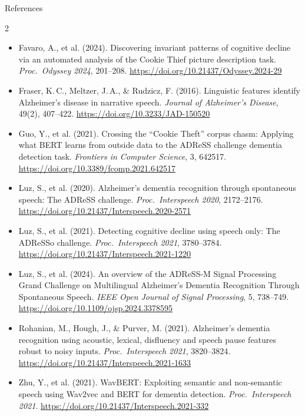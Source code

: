 \documentclass[final]{beamer}
\begin{document}
\begin{frame}[t]
\begin{block}{References}
\begin{multicols}{2}
\begin{itemize}[leftmargin=0pt, label={}, itemsep=0.18em]
  \item Favaro, A., et al. (2024). Discovering invariant patterns of
        cognitive decline via an automated analysis of the Cookie
        Thief picture description task. \textit{Proc.\ Odyssey 2024},
        201--208.
        \url{https://doi.org/10.21437/Odyssey.2024-29}

  \item Fraser, K.\,C., Meltzer, J.\,A., \& Rudzicz, F. (2016).
        Linguistic features identify Alzheimer's disease in narrative
        speech. \textit{Journal of Alzheimer's Disease}, 49(2),
        407--422.
        \url{https://doi.org/10.3233/JAD-150520}

  \item Guo, Y., et al. (2021). Crossing the ``Cookie Theft'' corpus
        chasm: Applying what BERT learns from outside data to the
        ADReSS challenge dementia detection task.
        \textit{Frontiers in Computer Science}, 3, 642517.
        \url{https://doi.org/10.3389/fcomp.2021.642517}

  \item Luz, S., et al. (2020). Alzheimer's dementia recognition
        through spontaneous speech: The ADReSS challenge.
        \textit{Proc.\ Interspeech 2020}, 2172--2176.
        \url{https://doi.org/10.21437/Interspeech.2020-2571}

  \item Luz, S., et al. (2021). Detecting cognitive decline using
        speech only: The ADReSSo challenge.
        \textit{Proc.\ Interspeech 2021}, 3780--3784.
        \url{https://doi.org/10.21437/Interspeech.2021-1220}

  \item Luz, S., et al. (2024). An overview of the ADReSS-M Signal
        Processing Grand Challenge on Multilingual Alzheimer's
        Dementia Recognition Through Spontaneous Speech.
        \textit{IEEE Open Journal of Signal Processing}, 5, 738--749.
        \url{https://doi.org/10.1109/ojsp.2024.3378595}

  \item Rohanian, M., Hough, J., \& Purver, M. (2021). Alzheimer's
        dementia recognition using acoustic, lexical, disfluency and
        speech pause features robust to noisy inputs.
        \textit{Proc.\ Interspeech 2021}, 3820--3824.
        \url{https://doi.org/10.21437/Interspeech.2021-1633}

  \item Zhu, Y., et al. (2021). WavBERT: Exploiting semantic and
        non-semantic speech using Wav2vec and BERT for dementia
        detection. \textit{Proc.\ Interspeech 2021}.
        \url{https://doi.org/10.21437/Interspeech.2021-332}
\end{itemize}
\end{multicols}
\end{block}

\end{frame}
\end{document}
